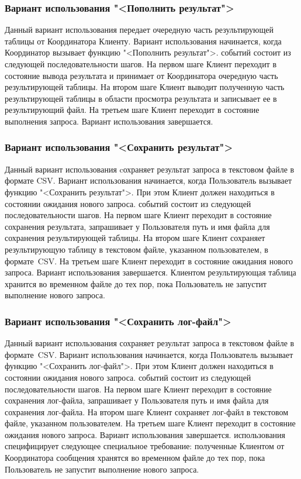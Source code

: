 \documentclass[11pt,oneside]{article}
\begin{document}
	\subsubsection{Вариант использования "<Пополнить результат">}
	Данный вариант использования передает очередную часть результирующей таблицы от Координатора Клиенту. Вариант использования начинается, когда Координатор вызывает функцию "<Пополнить результат">.
	 событий состоит из следующей последовательности шагов. На первом шаге Клиент переходит в состояние вывода результата и принимает от Координатора очередную часть результирующей таблицы. На втором шаге Клиент выводит полученную часть результирующей таблицы в области просмотра результата и записывает ее в результирующий файл. На третьем шаге Клиент переходит в состояние выполнения запроса. Вариант использования завершается.
	
	\subsubsection{Вариант использования "<Сохранить результат">}
	Данный вариант использования cохраняет результат запроса в текстовом файле в формате CSV. Вариант использования начинается, когда Пользователь вызывает функцию "<Сохранить результат">. При этом Клиент должен находиться в состоянии ожидания нового запроса.
	 событий состоит из следующей последовательности шагов. На первом шаге Клиент переходит в состояние сохранения результата, запрашивает у Пользователя путь и имя файла для сохранения результирующей таблицы. На втором шаге Клиент сохраняет результирующую таблицу в текстовом файле, указанном пользователем, в формате~CSV. На третьем шаге Клиент переходит в состояние ожидания нового запроса. Вариант использования завершается.
	 Клиентом результирующая таблица хранится во временном файле до тех пор, пока Пользователь не запустит выполнение нового запроса.
	
	\subsubsection{Вариант использования "<Сохранить лог-файл">}
	Данный вариант использования сохраняет результат запроса в текстовом файле в формате~CSV. Вариант использования начинается, когда Пользователь вызывает функцию "<Сохранить лог-файл">. При этом Клиент должен находиться в состоянии ожидания нового запроса.
	 событий состоит из следующей последовательности шагов. На первом шаге Клиент переходит в состояние сохранения лог-файла, запрашивает у Пользователя путь и имя файла для сохранения лог-файла. На втором шаге Клиент сохраняет лог-файл в текстовом файле, указанном пользователем. На третьем шаге Клиент переходит в состояние ожидания нового запроса. Вариант использования завершается.
	 использования специфицирует следующее специальное требование: полученные Клиентом от Координатора сообщения хранятся во временном файле до тех пор, пока Пользователь не запустит выполнение нового запроса.
	
\end{document}
